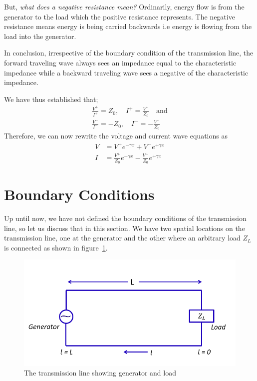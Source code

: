 But, \emph{what does a negative resistance mean?} Ordinarily, energy flow is from the generator to the load which the positive resistance represents. The negative resistance means energy is being carried backwards i.e energy is flowing from the load into the generator.

In conclusion, irrespective of the boundary condition of the transmission line, the forward traveling wave always sees an impedance equal to the characteristic impedance while a backward traveling wave sees a negative of the characteristic impedance.

We have thus established that;
\begin{align*}
\frac{V^+}{I^+} = Z_0,\quad I^+ = \frac{V^+}{Z_0}\quad\text{and}\\
\frac{V^-}{I^-} = -Z_0,\quad I^- = -\frac{V^-}{Z_0}
\end{align*}
Therefore, we can now rewrite the voltage and current wave equations as
\begin{align}
V &= V^+e^{-\gamma x}+V^-e^{+\gamma x}
\label{eqn:voltagelec3}\\
I &= \frac{V^+}{Z_0}e^{-\gamma x}-\frac{V^-}{Z_0}e^{+\gamma x}
\label{eqn:currentlec3}
\end{align}

\section{Boundary Conditions}
Up until now, we have not defined the boundary conditions of the transmission line, so let us discuss that in this section. We have two spatial locations on the transmission line, one at the generator and the other where an arbitrary load $Z_L$ is connected as shown in figure~\ref{fig:tlcircuit}.
\begin{figure}[h]
\centering
\includegraphics[scale=0.45]{./graphics/TX_load_and_source}
\caption{The transmission line showing generator and load}
\label{fig:tlcircuit}
\end{figure}

